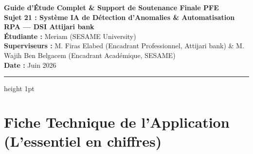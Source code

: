 \documentclass[11pt,a4paper]{article}
\begin{document}
\begin{center}
    {\LARGE\bfseries\color{primaryblue} Guide d'Étude Complet \& Support de Soutenance Finale PFE} \\[0.3cm]
    {\large\bfseries\color{accentorange} Sujet 21 : Système IA de Détection d'Anomalies \& Automatisation RPA --- DSI Attijari bank} \\[0.4cm]
    \textbf{Étudiante :} Meriam (SESAME University) \\
    \textbf{Superviseurs :} M. Firas Elabed (Encadrant Professionnel, Attijari bank) \& M. Wajih Ben Belgacem (Encadrant Académique, SESAME) \\
    \textbf{Date :} Juin 2026
\end{center}
\vspace{0.3cm}
\hrule height 1pt
\vspace{0.5cm}

\section{Fiche Technique de l'Application (L'essentiel en chiffres)}
\end{document}
